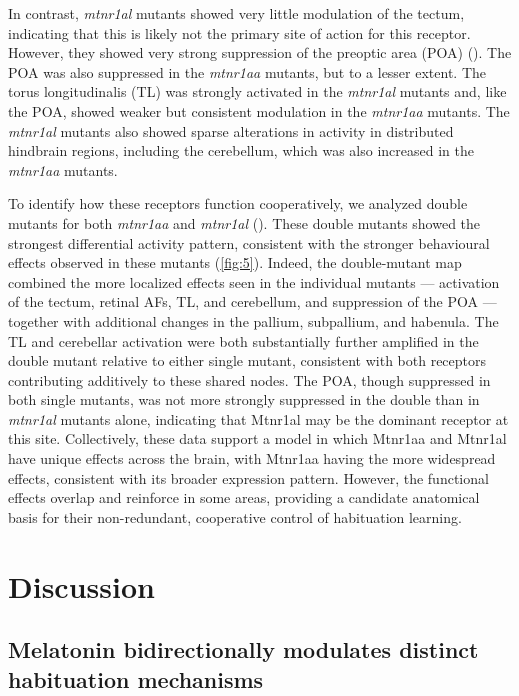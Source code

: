\documentclass[9.5pt]{RandlettLab_elife}            %
\begin{document}
In contrast, \emph{mtnr1al} mutants showed very little modulation of the tectum, indicating that this is likely not the primary site of action for this receptor. 
However, they showed very strong suppression of the preoptic area (POA) (). 
The POA was also suppressed in the \emph{mtnr1aa} mutants, but to a lesser extent.
The torus longitudinalis (TL) was strongly activated in the \emph{mtnr1al} mutants and, like the POA, showed weaker but consistent modulation in the \emph{mtnr1aa} mutants.
The \emph{mtnr1al} mutants also showed sparse alterations in activity in distributed hindbrain regions, including the cerebellum, which was also increased in the \emph{mtnr1aa} mutants.

To identify how these receptors function cooperatively, we analyzed double mutants for both \emph{mtnr1aa} and \emph{mtnr1al} (). 
These double mutants showed the strongest differential activity pattern, consistent with the stronger behavioural effects observed in these mutants (\autoref{fig:5}). 
Indeed, the double-mutant map combined the more localized effects seen in the individual mutants — activation of the tectum, retinal AFs, TL, and cerebellum, and suppression of the POA — together with additional changes in the pallium, subpallium, and habenula.
The TL and cerebellar activation were both substantially further amplified in the double mutant relative to either single mutant, consistent with both receptors contributing additively to these shared nodes. 
The POA, though suppressed in both single mutants, was not more strongly suppressed in the double than in \emph{mtnr1al} mutants alone, indicating that Mtnr1al may be the dominant receptor at this site.
Collectively, these data support a model in which Mtnr1aa and Mtnr1al have unique effects across the brain, with Mtnr1aa having the more widespread effects, consistent with its broader expression pattern. 
However, the functional effects overlap and reinforce in some areas, providing a candidate anatomical basis for their non-redundant, cooperative control of habituation learning.


\section{Discussion}

\subsection*{Melatonin bidirectionally modulates distinct habituation mechanisms}
\end{document}
